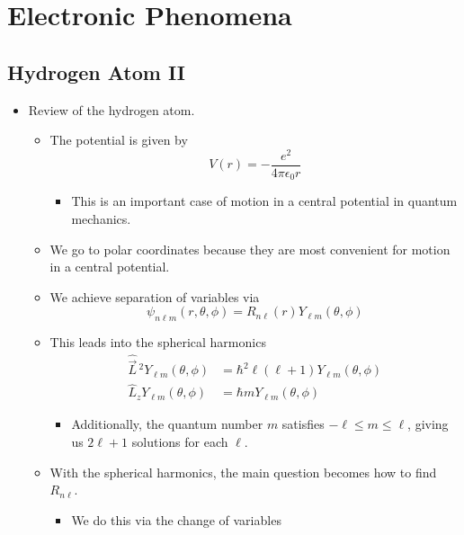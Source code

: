 \documentclass[../notes.tex]{subfiles}
\begin{document}
\chapter{Electronic Phenomena}
\section{Hydrogen Atom II}
\begin{itemize}
    \item {}Review of the hydrogen atom.
    \begin{itemize}
        \item The potential is given by
        \begin{equation*}
            V(r) = -\frac{e^2}{4\pi\epsilon_0r}
        \end{equation*}
        \begin{itemize}
            \item This is an important case of motion in a central potential in quantum mechanics.
        \end{itemize}
        \item We go to polar coordinates because they are most convenient for motion in a central potential.
        \item We achieve separation of variables via
        \begin{equation*}
            \psi_{n\ell m}(r,\theta,\phi) = R_{n\ell}(r)Y_{\ell m}(\theta,\phi)
        \end{equation*}
        \item This leads into the spherical harmonics
        \begin{align*}
            \hat{\vec{L}}{\,}^2Y_{\ell m}(\theta,\phi) &= \hbar^2\ell(\ell+1)Y_{\ell m}(\theta,\phi)\\
            \hat{L}_zY_{\ell m}(\theta,\phi) &= \hbar mY_{\ell m}(\theta,\phi)
        \end{align*}
        \begin{itemize}
            \item Additionally, the quantum number $m$ satisfies $-\ell\leq m\leq\ell$, giving us $2\ell+1$ solutions for each $\ell$.
        \end{itemize}
        \item With the spherical harmonics, the main question becomes how to find $R_{n\ell}$.
        \begin{itemize}
            \item We do this via the change of variables

\end{itemize}
\end{itemize}
\end{itemize}
\end{document}
